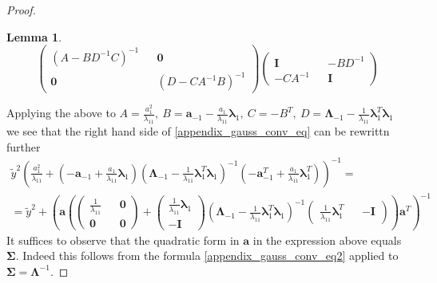\documentclass[10pt,fleqn]{amsart}
\newtheorem{lemma}[theorem]{Lemma}
\theoremstyle{definition}
\theoremstyle{remark}
\numberwithin{equation}{section}
\newcommand{\aaa}{\boldsymbol{a}}
\newcommand{\SSigma}{\boldsymbol{\Sigma}}
\newcommand{\llambda}{\boldsymbol{\lambda}}
\newcommand{\LLambda}{\boldsymbol{\Lambda}}
\newcommand{\ytilde}{\widetilde{y}}
\begin{document}
\begin{proof}
\begin{lemma}
\begin{equation}
        \left(\begin{matrix}\left(A-BD^{-1}C\right)^{-1}&&\boldsymbol{0}\\\boldsymbol{0}&&\left(D-CA^{-1}B\right)^{-1}\end{matrix}\right)
        \left(\begin{matrix}\boldsymbol{I}&&-BD^{-1}\\-CA^{-1}&&\boldsymbol{I}\end{matrix}\right)
    \end{equation}
\end{lemma}
Applying the above to
$A=\frac{a_1^2}{\lambda_{11}},\ B=\aaa_{-1}-\frac{a_1}{\lambda_{11}}\llambda_1,\ C=-B^T,\ D=\LLambda_{-1}-\frac 1{\lambda_{11}}\llambda_1^T\llambda_1$
we see that the right hand side of \ref{appendix_gauss_conv_eq} can be rewrittn further
\begin{equation}\begin{split}
    \ytilde^2\left(
        \frac{a_1^2}{\lambda_{11}}+
        \left(-\aaa_{-1}+\frac{a_1}{\lambda_{11}}\llambda_1\right)
        \left(\LLambda_{-1}-\frac 1{\lambda_{11}}\llambda_1^T\llambda_1\right)^{-1}
        \left(-\aaa_{-1}^T+\frac{a_1}{\lambda_{11}}\llambda_1^T\right)
        \right)^{-1}=\\
        =\ytilde^2+\left(\aaa\left(
            \left(\begin{matrix}\frac 1{\lambda_{11}}&&\boldsymbol{0}\\\boldsymbol{0}&&\boldsymbol{0}\end{matrix}\right)+
            \left(\begin{matrix}\frac 1{\lambda_{11}}\llambda_1\\-\boldsymbol{I}\end{matrix}\right)
            \left(\LLambda_{-1}-\frac 1{\lambda_{11}}\llambda_1^T\llambda_1\right)^{-1}
            \left(\begin{matrix}\frac 1{\lambda_{11}}\llambda_1^T&&-\boldsymbol{I}\end{matrix}\right)
            \right)\aaa^T\right)^{-1}
\end{split}\end{equation}
It suffices to observe that the quadratic form in $\aaa$ in the expression above equals $\SSigma$. Indeed this follows from
the formula \ref{appendix_gauss_conv_eq2} applied to $\SSigma=\LLambda^{-1}$.
\end{proof}
\end{document}
